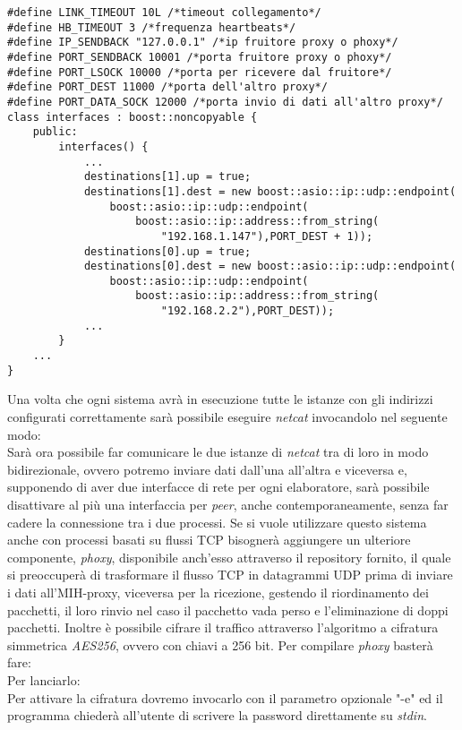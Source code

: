 \begin{verbatim}
#define LINK_TIMEOUT 10L /*timeout collegamento*/
#define HB_TIMEOUT 3 /*frequenza heartbeats*/
#define IP_SENDBACK "127.0.0.1" /*ip fruitore proxy o phoxy*/
#define PORT_SENDBACK 10001 /*porta fruitore proxy o phoxy*/
#define PORT_LSOCK 10000 /*porta per ricevere dal fruitore*/
#define PORT_DEST 11000 /*porta dell'altro proxy*/
#define PORT_DATA_SOCK 12000 /*porta invio di dati all'altro proxy*/
class interfaces : boost::noncopyable {
    public:
        interfaces() {
            ...
            destinations[1].up = true;
            destinations[1].dest = new boost::asio::ip::udp::endpoint(
                boost::asio::ip::udp::endpoint(
                    boost::asio::ip::address::from_string(
                        "192.168.1.147"),PORT_DEST + 1));
            destinations[0].up = true;
            destinations[0].dest = new boost::asio::ip::udp::endpoint(
                boost::asio::ip::udp::endpoint(
                    boost::asio::ip::address::from_string(
                        "192.168.2.2"),PORT_DEST));
            ...
        }
    ...
}
\end{verbatim}
Una volta che ogni sistema avrà in esecuzione tutte le istanze con gli indirizzi configurati correttamente sarà possibile eseguire {\em netcat} invocandolo nel seguente modo:\\
Sarà ora possibile far comunicare le due istanze di {\em netcat} tra di loro in modo bidirezionale, ovvero potremo inviare dati dall'una all'altra e viceversa e, supponendo di aver due interfacce di rete per ogni elaboratore, sarà possibile disattivare al più una interfaccia per {\em peer}, anche contemporaneamente, senza far cadere la connessione tra i due processi. Se si vuole utilizzare questo sistema anche con processi basati su flussi TCP bisognerà aggiungere un ulteriore componente, {\em phoxy}, disponibile anch'esso attraverso il repository fornito, il quale si preoccuperà di trasformare il flusso TCP in datagrammi UDP prima di inviare i dati all'MIH-proxy, viceversa per la ricezione, gestendo il riordinamento dei pacchetti, il loro rinvio nel caso il pacchetto vada perso e l'eliminazione di doppi pacchetti. Inoltre è possibile cifrare il traffico attraverso l'algoritmo a cifratura simmetrica {\em AES256}, ovvero con chiavi a 256 bit. Per compilare {\em phoxy} basterà fare:\\
Per lanciarlo:\\
Per attivare la cifratura dovremo invocarlo con il parametro opzionale "-e" ed il programma chiederà all'utente di scrivere la password direttamente su {\em stdin}.

